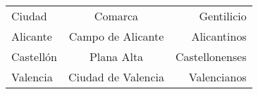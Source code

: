 \documentclass{article}
\begin{document}
\begin{tabular}{lcr}
  Ciudad    & Comarca            & Gentilicio  \\
  Alicante  & Campo de Alicante  & Alicantinos \\
  Castellón & Plana Alta         & Castellonenses \\
  Valencia  & Ciudad de Valencia & Valencianos
\end{tabular}
\end{document}
